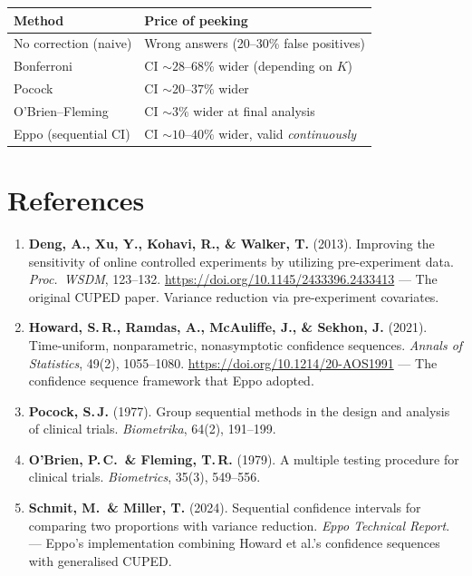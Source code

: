 \documentclass[12pt, a4paper]{article}
\begin{document}
\begin{center}
\begin{tabular}{@{} l l @{}}
\toprule
\textbf{Method} & \textbf{Price of peeking} \\
\midrule
No correction (naive) & Wrong answers (20--30\% false positives) \\
Bonferroni & CI $\sim\!28$--$68\%$ wider (depending on $K$) \\
Pocock & CI $\sim\!20$--$37\%$ wider \\
O'Brien--Fleming & CI $\sim\!3\%$ wider at final analysis \\
Eppo (sequential CI) & CI $\sim\!10$--$40\%$ wider, valid \emph{continuously} \\
\bottomrule
\end{tabular}
\end{center}


\newpage
\section{References}

\begin{enumerate}
  \item \textbf{Deng, A., Xu, Y., Kohavi, R., \& Walker, T.} (2013).
        Improving the sensitivity of online controlled experiments by
        utilizing pre-experiment data.
        \textit{Proc.\ WSDM}, 123--132.
        \url{https://doi.org/10.1145/2433396.2433413}
        --- The original CUPED paper.  Variance reduction via pre-experiment
        covariates.

  \item \textbf{Howard, S.\,R., Ramdas, A., McAuliffe, J., \& Sekhon, J.}
        (2021).
        Time-uniform, nonparametric, nonasymptotic confidence sequences.
        \textit{Annals of Statistics}, 49(2), 1055--1080.
        \url{https://doi.org/10.1214/20-AOS1991}
        --- The confidence sequence framework that Eppo adopted.

  \item \textbf{Pocock, S.\,J.} (1977).
        Group sequential methods in the design and analysis of clinical
        trials.
        \textit{Biometrika}, 64(2), 191--199.

  \item \textbf{O'Brien, P.\,C.\ \& Fleming, T.\,R.} (1979).
        A multiple testing procedure for clinical trials.
        \textit{Biometrics}, 35(3), 549--556.

  \item \textbf{Schmit, M.\ \& Miller, T.} (2024).
        Sequential confidence intervals for comparing two proportions with
        variance reduction.
        \textit{Eppo Technical Report}.
        --- Eppo's implementation combining Howard et al.'s confidence
        sequences with generalised CUPED.
\end{enumerate}
\end{document}
